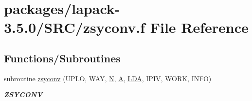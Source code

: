 \hypertarget{zsyconv_8f}{}\section{packages/lapack-\/3.5.0/\+S\+R\+C/zsyconv.f File Reference}
\label{zsyconv_8f}
\subsection*{Functions/\+Subroutines}
\begin{DoxyCompactItemize}
\item 
subroutine \hyperlink{group__complex16SYcomputational_gaf9bb905346883507dbdb466d5c8a0fbb}{zsyconv} (U\+P\+L\+O, W\+A\+Y, \hyperlink{polmisc_8c_a0240ac851181b84ac374872dc5434ee4}{N}, \hyperlink{classA}{A}, \hyperlink{example__user_8c_ae946da542ce0db94dced19b2ecefd1aa}{L\+D\+A}, I\+P\+I\+V, W\+O\+R\+K, I\+N\+F\+O)
\begin{DoxyCompactList}\small\item\em {\bfseries Z\+S\+Y\+C\+O\+N\+V} \end{DoxyCompactList}\end{DoxyCompactItemize}

